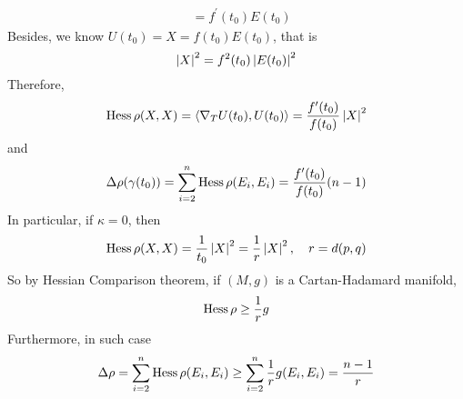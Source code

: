 \begin{enumerate}[label=\arabic{*}]
\begin{exam}
\begin{equation*}
\begin{aligned}
				&= f^\prime(t_0)E(t_0)
			\end{aligned}
		\end{equation*}
		Besides, we know $U(t_0) = X = f(t_0)E(t_0)$, that is
		\begin{equation*}
			\left\lvert X\right\lvert^2 = f^2(t_0)\left\lvert E(t_0)\right\lvert^2
		\end{equation*}
		Therefore,
		\begin{equation*}
			\operatorname{Hess}\rho(X,X) = \left\langle \nabla_TU(t_0),U(t_0) \right\rangle = \frac{f^\prime(t_0)}{f(t_0)}\left\lvert X\right\lvert^2
		\end{equation*}
		and
		\begin{equation*}
			\Delta \rho(\gamma(t_0)) = \sum_{i=2}^n \operatorname{Hess}\rho(E_i,E_i) = \frac{f^\prime(t_0)}{f(t_0)} (n-1)
		\end{equation*}
		In particular, if $\kappa = 0$, then 
		\begin{equation*}
			\operatorname{Hess}\rho(X,X) = \frac{1}{t_0}\left\lvert X\right\lvert^2 = \frac{1}{r}\left\lvert X\right\lvert^2,\quad r = d(p,q)
		\end{equation*}
		So by Hessian Comparison theorem, if $(M,g)$ is a Cartan-Hadamard manifold,
		\begin{equation*}
			\operatorname{Hess}\rho \geq \frac{1}{r}g
		\end{equation*}
		Furthermore, in such case
		\begin{equation*}
			\Delta \rho = \sum_{i=2}^n \operatorname{Hess}\rho(E_i,E_i) \geq  \sum_{i=2}^n \frac{1}{r}g(E_i,E_i) = \frac{n-1}{r}
		\end{equation*} 
	\end{exam}


\end{enumerate}

